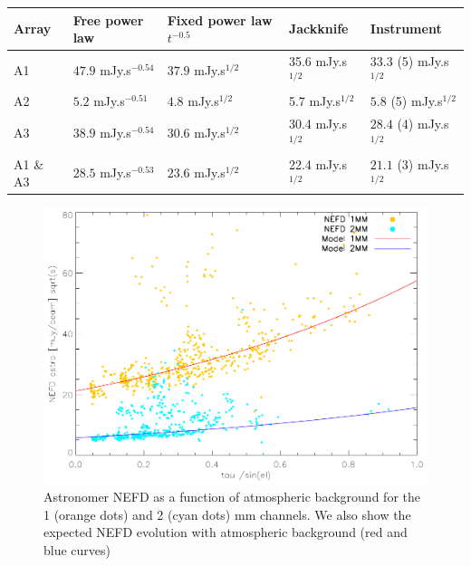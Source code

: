 \begin{table}
\begin{tabular}{|l|l|l|l|l|}
\hline
Array & Free power law & Fixed power law $t^{-0.5}$ & Jackknife & Instrument \\
\hline
A1       & $47.9$ mJy.s$^{-0.54}$ & $37.9$ mJy.s$^{1/2}$ & 35.6 mJy.s$^{1/2}$ & $33.3$ (5) mJy.s$^{1/2}$\\
A2       & $5.2$  mJy.s$^{-0.51}$ & $4.8$  mJy.s$^{1/2}$ & 5.7  mJy.s$^{1/2}$ & $5.8$  (5) mJy.s$^{1/2}$\\
A3       & $38.9$ mJy.s$^{-0.54}$ & $30.6$ mJy.s$^{1/2}$ & 30.4 mJy.s$^{1/2}$ & $28.4$ (4) mJy.s$^{1/2}$\\
A1 \& A3 & $28.5$ mJy.s$^{-0.53}$ & $23.6$ mJy.s$^{1/2}$ & 22.4 mJy.s$^{1/2}$ & $21.1$ (3) mJy.s$^{1/2}$\\
\hline
\end{tabular}
\label{tab:nefd}
\end{table}


\begin{figure}
\begin{center}
\includegraphics[clip, angle=0, scale =0.8]{Figures/NEFDIndScans/nefd_tau_run22.pdf}
\caption{Astronomer NEFD as a function of atmospheric background for the 1 (orange dots) and 2 (cyan dots) mm channels. We also show the expected NEFD evolution with atmospheric background (red and blue curves)}
\label{fig:nefdvsbackground}
\end{center}
\end{figure}

